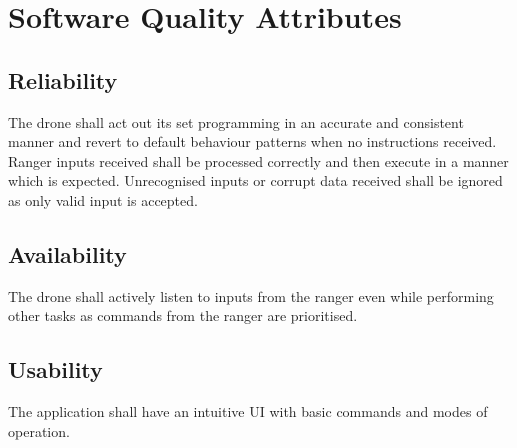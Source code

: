 \section{Software Quality Attributes}
\subsection {Reliability}
The drone shall act out its set programming in an accurate and consistent manner and revert to default behaviour patterns when no instructions received.  
\newline
Ranger inputs received shall be processed correctly and then execute in a manner which is expected. Unrecognised inputs or corrupt data received shall be ignored as only valid input is accepted.
\newline

\subsection {Availability}
The drone shall actively listen to inputs from the ranger even while performing other tasks as commands from the ranger are prioritised. 
\newline

\subsection {Usability}
The application shall have an intuitive UI with basic commands and modes of operation.
\newline

